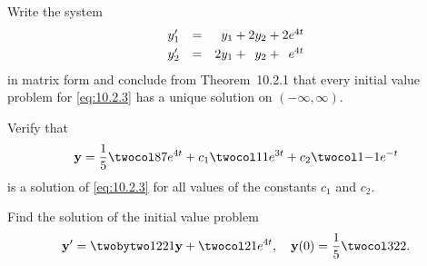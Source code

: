 \setcounter{example}{0}
\setcounter{equation}{2}
\begin{example}
  \label{example:10.2.1} \rm \mbox{}
  \newline
  \begin{alist}
    \item %
    Write the system
    \begin{equation}
      \label{eq:10.2.3}
      \begin{array}{rcl}
        y_{1}' & = & \phantom{2}y_{1}+2y_{2}+2e^{4t}           \\[1\jot]
        y_{2}' & = & 2y_{1}+\phantom{2}y_{2}+\phantom{2}e^{4t}
      \end{array}
    \end{equation}
    in matrix form and conclude from Theorem~10.2.1 that every initial value problem
    for \eqref{eq:10.2.3} has a unique solution on $(-\infty,\infty)$.

    \item %
    Verify that
    \begin{equation}
      \label{eq:10.2.4}{\bf y}= \frac{1}{5}\twocol87e^{4t}+c_{1}\twocol11e^{3t}+c_{2}\twocol1{-1}e^{-t}
    \end{equation}
    is a solution of \eqref{eq:10.2.3} for all values of the constants $c_{1}$ and $c_{2}$.

    \item %
    Find the solution of the initial value problem
    \begin{equation}
      \label{eq:10.2.5}{\bf y}'=\twobytwo1221{\bf y}+\twocol21e^{4t},\quad{\bf y}(0)=\frac{1}{5}\twocol3{22}.
    \end{equation}
  \end{alist}
\end{example}
